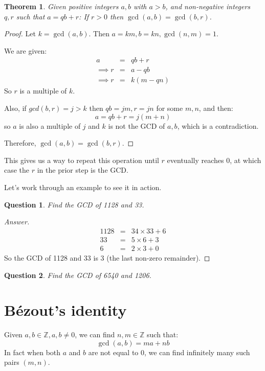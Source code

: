 \documentclass{article}
\newtheorem{theorem}{Theorem}
\newtheorem{question}{Question}
\begin{document}
\begin{theorem}
Given positive integers $a,b$ with $a>b$, and non-negative integers $q,r$ such that $a=qb+r$:
If $r>0$ then $\gcd(a,b) = \gcd(b,r)$.
\end{theorem}

\begin{proof}
Let $k = \gcd(a,b)$. Then $a=km, b=kn, \gcd(n,m) = 1$.

We are given:
\begin{eqnarray*}
	 a &=& qb+r \\
	\implies r &=& a-qb \\
	\implies r &=& k(m-qn) 
\end{eqnarray*}
So $r$ is a multiple of $k$.

Also, if $gcd(b,r)=j > k$ then $qb = jm, r=jn$ for some $m,n$, and then:
\[ a = qb+r = j(m+n) \]
so $a$ is also a multiple of $j$ and $k$ is not the GCD of $a,b$, which is a contradiction.

Therefore, $\gcd(a,b) = \gcd(b,r)$. 
\end{proof}

This gives us a way to repeat this operation until $r$ eventually reaches $0$, at which case the $r$
in the prior step is the GCD.

Let's work through an example to see it in action.

\begin{question}
Find the GCD of 1128 and 33.
\end{question}
\begin{proof}[Answer]
	\begin{eqnarray*}
		1128 &=& 34\times 33 + 6 \\
		33 &=& 5\times 6 + 3 \\
		6 &=& 2 \times 3 + 0   
	\end{eqnarray*}
	So the GCD of 1128 and 33 is 3 (the last non-zero remainder).
\end{proof}

\begin{question} Find the GCD of 6540 and 1206. \end{question}
\vspace*{\bigskipamount}

\section{Bézout's identity}

Given $a,b \in \mathbb{Z}, a, b \neq 0$, we can find $n,m \in \mathbb{Z}$ such that:
\[ \gcd(a,b) = ma + nb \]
In fact when both $a$ and $b$ are not equal to 0, we can find infinitely many such pairs $(m,n)$.
\end{document}
